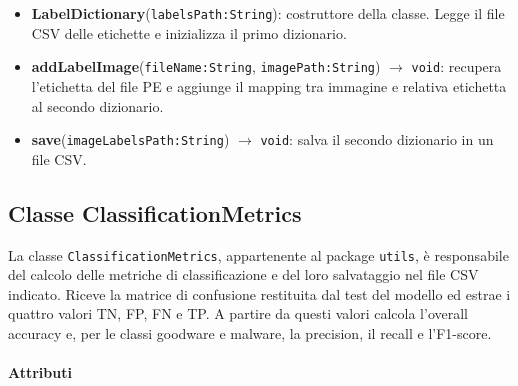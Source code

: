 \begin{itemize}
    \raggedright
    \item \textbf{LabelDictionary}(\texttt{labelsPath:String}): costruttore della classe.
    Legge il file CSV delle etichette e inizializza il primo dizionario.
    \item \textbf{addLabelImage}(\texttt{fileName:String},
    \texttt{imagePath:String}) $\rightarrow$ \texttt{void}: recupera
    l’etichetta del file PE e aggiunge il mapping tra immagine e relativa etichetta
    al secondo dizionario.
    \item \textbf{save}(\texttt{imageLabelsPath:String})
    $\rightarrow$ \texttt{void}: salva il secondo dizionario in un file CSV.
\end{itemize}

\subsection{Classe ClassificationMetrics}

La classe \texttt{ClassificationMetrics}, appartenente al package
\texttt{utils}, è responsabile del calcolo delle metriche di classificazione e del
loro salvataggio nel file CSV indicato. Riceve la matrice di confusione restituita dal test del
modello ed estrae i quattro valori TN, FP, FN e TP. A partire da questi
valori calcola l’overall accuracy e, per le classi goodware e malware, la
precision, il recall e l’F1-score.

\paragraph{Attributi}

